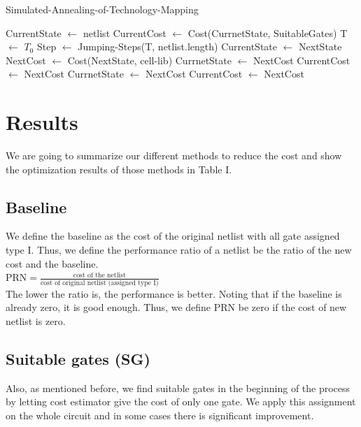 \documentclass[conference]{IEEEtran}
\begin{document}
\begin{algorithm}
\begin{algorithmic}[1]
    \caption{Simulated-Annealing-of-Technology-Mapping}\label{euclid}
    \State CurrentState $\gets$ netlist
    \State CurrentCost $\gets$ Cost(CurrnetState, SuitableGates)
    \State T $\gets$ $T_0$
        \State Step $\gets$ Jumping-Steps(T, netlist.length)
            \State CurrentState $\gets$ NextState
        \EndFor
        \State NextCost $\gets$ Cost(NextState, cell-lib)
            \State CurrnetState $\gets$ NextCost
            \State CurrentCost $\gets$ NextCost
            \State CurrnetState $\gets$ NextCost
            \State CurrentCost $\gets$ NextCost
        \EndIf
    \EndWhile
\end{algorithmic}
\end{algorithm}

\section{Results}
We are going to summarize our different methods to reduce the cost and show the optimization results of those methods in Table I.\\

\subsection{Baseline}
We define the baseline as the cost of the original netlist with all gate assigned type I. Thus, we define the performance ratio of a netlist be the ratio of the new cost and the baseline. \\
$\text{PRN} = \frac{\text{cost of the netlist}}{\text{cost of original netlist (assigned type I)}}$ \\
The lower the ratio is, the performance is better. Noting that if the baseline is already zero, it is good enough. Thus, we define PRN be zero if the cost of new netlist is zero.\\

\subsection{Suitable gates (SG)}
Also, as mentioned before, we find suitable gates in the beginning of the process by letting cost estimator give the cost of only one gate. We apply this assignment on the whole circuit and in some cases there is significant improvement. \\
\end{document}
